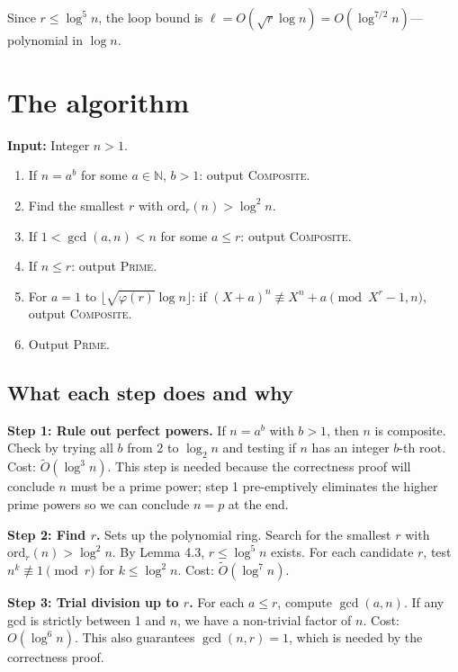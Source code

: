 \documentclass[12pt]{article}
\newcommand{\N}{\mathbb{N}}
\newcommand{\ord}{\mathrm{ord}}
\newcommand{\OO}{\widetilde{O}}
\begin{document}
Since $r\leq\log^5 n$, the loop bound is $\ell = O(\sqrt{r}\log n) = O(\log^{7/2}n)$---polynomial in $\log n$.

\section{The algorithm}

\begin{thmbox}
\textbf{Input:} Integer $n>1$.
\begin{enumerate}[label=\textbf{Step \arabic*.}, leftmargin=2.5cm, itemsep=4pt]
  \item If $n = a^b$ for some $a\in\N$, $b>1$: output \textsc{Composite}.
  \item Find the smallest $r$ with $\ord_r(n) > \log^2 n$.
  \item If $1<\gcd(a,n)<n$ for some $a\leq r$: output \textsc{Composite}.
  \item If $n \leq r$: output \textsc{Prime}.
  \item For $a=1$ to $\lfloor\sqrt{\varphi(r)}\log n\rfloor$: if $(X+a)^n \not\equiv X^n+a \pmod{X^r-1, n}$, output \textsc{Composite}.
  \item Output \textsc{Prime}.
\end{enumerate}
\end{thmbox}

\subsection{What each step does and why}

\textbf{Step 1: Rule out perfect powers.}
If $n=a^b$ with $b>1$, then $n$ is composite. Check by trying all $b$ from 2 to $\log_2 n$ and testing if $n$ has an integer $b$-th root. Cost: $\OO(\log^3 n)$. This step is needed because the correctness proof will conclude $n$ must be a prime power; step 1 pre-emptively eliminates the higher prime powers so we can conclude $n=p$ at the end.

\textbf{Step 2: Find $r$.}
Sets up the polynomial ring. Search for the smallest $r$ with $\ord_r(n)>\log^2 n$. By Lemma 4.3, $r\leq\log^5 n$ exists. For each candidate $r$, test $n^k\not\equiv 1\pmod{r}$ for $k\leq\log^2 n$. Cost: $\OO(\log^7 n)$.

\textbf{Step 3: Trial division up to $r$.}
For each $a\leq r$, compute $\gcd(a,n)$. If any gcd is strictly between 1 and $n$, we have a non-trivial factor of $n$. Cost: $O(\log^6 n)$. This also guarantees $\gcd(n,r)=1$, which is needed by the correctness proof.
\end{document}
